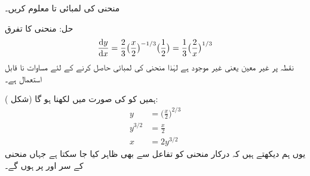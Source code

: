 منحنی  کی لمبائی  تا  معلوم کریں۔

حل:\quad
منحنی کا تفرق
\begin{align*}
\frac{\dif y}{\dif x}=\frac{2}{3}\big(\frac{x}{2}\big)^{-1/3}\big(\frac{1}{2}\big)=\frac{1}{3}\big(\frac{2}{x}\big)^{1/3}
\end{align*}
نقطہ  پر غیر معین یعنی غیر موجود ہے لہٰذا منحنی کی لمبائی حاصل کرنے کے لئے  مساوات  نا قابل استعمال ہے۔

ہمیں  کو  کی صورت میں لکھنا ہو گا (شکل ):
\begin{align*}
y&=\big(\frac{x}{2}\big)^{2/3}\\
y^{3/2}&=\frac{x}{2}\\
x&=2y^{3/2}
\end{align*}
یوں ہم دیکھتے ہیں کہ درکار منحنی کو تفاعل  سے بھی ظاہر کیا جا سکتا ہے جہاں منحنی کے سر  اور  پر ہوں گے۔

